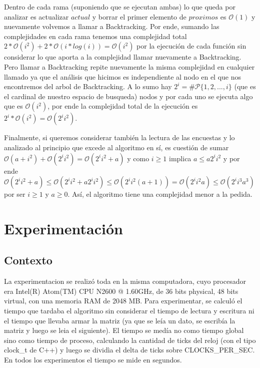 \documentclass[A4paper,oneside,fleqn,10pt]{article}
\theoremstyle{definition}
\begin{document}
Dentro de cada rama (suponiendo que se ejecutan ambas) lo que queda por analizar es actualizar $actual$ y borrar el primer elemento de $proximos$ es $\mathcal{O} (1)$ y nuevamente volvemos a llamar a Backtracking. Por ende, sumando las complejidades en cada rama tenemos una complejidad total $2*\mathcal{O} (i^2)+ 2* \mathcal{O} (i*log(i)) = \mathcal{O} (i^2)$ por la ejecución de cada función sin considerar lo que aporta a la complejidad llamar nuevamente a Backtracking. Pero llamar a Backtracking repite nuevamente la misma complejidad en cualquier llamado ya que el análisis que hicimos es independiente al nodo en el que nos encontremos del arbol de Backtracking. A lo sumo hay $2^i = \# \mathcal{P} \{1,2,...,i\} $ (que es el cardinal de nuestro espacio de busqueda) nodos y por cada uno se ejecuta algo que es $\mathcal{O} (i^2)$, por ende la complejidad total de la ejecución es $2^i * \mathcal{O} (i^2) = \mathcal{O} (2^i i^2)$.

Finalmente, si queremos considerar también la lectura de las encuestas y lo analizado al principio que excede al algoritmo en sí, es cuestión de sumar $\mathcal{O} (a+i^2)+\mathcal{O} (2^i i^2) = \mathcal{O} (2^i i^2+a)$  y como $i \geq 1$ implica $a \leq a 2^i i^2$ y por ende $ \mathcal{O} (2^i i^2+a) \leq \mathcal{O} (2^i i^2+a 2^i i^2 ) \leq \mathcal{O}(2^i i^2 (a+1)) = \mathcal{O} (2^i i^2 a) \leq \mathcal{O} (2^i i^3 a^3)$ por ser $i \geq 1$ y $a \geq 0$. Así, el algoritmo tiene una complejidad menor a la pedida.

\section{Experimentación}
\subsection{Contexto}

La experimentacion se realizó toda en la misma computadora, cuyo procesador era Intel(R) Atom(TM) CPU N2600 @ 1.60GHz, de 36 bits physical, 48 bits virtual, con una memoria RAM de 2048 MB.  Para experimentar, se calculó el tiempo que tardaba el algoritmo sin considerar el tiempo de lectura y escritura ni el tiempo que llevaba armar la matriz (ya que se leía un dato, se escribía la matriz y luego se leia el siguiente). El tiempo se medía no como tiempo global sino como tiempo de proceso, calculando la cantidad de ticks del reloj (con el tipo clock\_t de C++) y luego se dividìa el delta de ticks sobre CLOCKS\_PER\_SEC. En todos los experimentos el tiempo se mide en segundos. 
 
\end{document}
